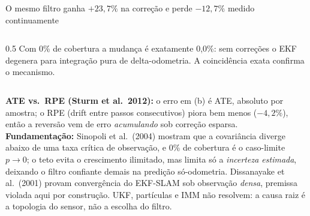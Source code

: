 \documentclass[aspectratio=169]{beamer}
\begin{document}
\begin{frame}{O mesmo filtro ganha $+23{,}7\%$ na correção e perde $-12{,}7\%$ medido continuamente}
\begin{columns}[T]
\begin{column}{0.5\textwidth}
\vspace{0.1cm}
Com 0\% de cobertura a mudança é exatamente 0,0\%: sem correções o EKF degenera para integração pura de delta-odometria. A coincidência exata confirma o mecanismo.
\end{column}
\end{columns}

\vspace{0.1cm}
\scriptsize\textbf{ATE vs.\ RPE (Sturm et al.\ 2012):} o erro em (b) é ATE, absoluto por amostra; o RPE (drift entre passos consecutivos) piora bem menos ($-4,2\%$), então a reversão vem de erro \emph{acumulando} sob correção esparsa. \textbf{Fundamentação:} Sinopoli et al.\ (2004) mostram que a covariância diverge abaixo de uma taxa crítica de observação, e 0\% de cobertura é o caso-limite $p\to0$; o teto evita o crescimento ilimitado, mas limita só a \emph{incerteza estimada}, deixando o filtro confiante demais na predição só-odometria. Dissanayake et al.\ (2001) provam convergência do EKF-SLAM sob observação \emph{densa}, premissa violada aqui por construção. UKF, partículas e IMM não resolvem: a causa raiz é a topologia do sensor, não a escolha do filtro.
\end{frame}
\end{document}
